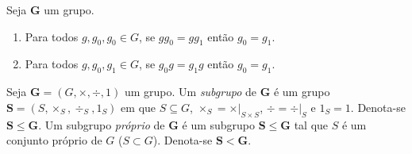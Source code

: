 \begin{exercise}[Cancelamento]
Seja $\bm G$ um grupo.
	\begin{enumerate}
	\item Para todos $g,g_0,g_0 \in G$, se $gg_0 = gg_1$ então $g_0 = g_1$.
	\item Para todos $g,g_0,g_1 \in G$, se $g_0g = g_1g$ então $g_0 = g_1$.
	\end{enumerate}
\end{exercise}

\begin{definition}
Seja $\bm G = (G,\times,\div,1)$ um grupo. Um \emph{subgrupo} de $\bm G$ é um grupo $\bm S=(S,\times_S,\div_S,1_S)$ em que $S \subseteq G$, $\times_S=\times|_{S \times S}$, $\div = \div|_S$ e $1_S=1$. Denota-se $\bm S \leq \bm G$.
Um subgrupo \emph{próprio} de $\bm G$ é um subgrupo $\bm S \leq \bm G$ tal que $S$ é um conjunto próprio de $G$ ($S  \subset G$). Denota-se $\bm S < \bm G$.
\end{definition}

